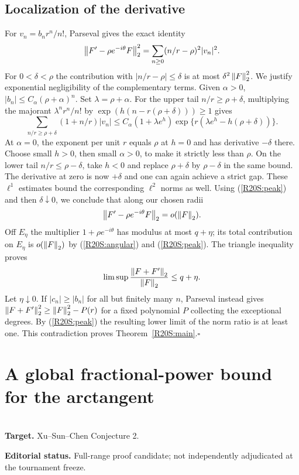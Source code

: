 \documentclass[11pt,a4paper]{article}
\begin{document}
\subsection{Localization of the derivative}
For $v_n=b_n r^n/n!$, Parseval gives the exact identity
\[
 \left\|F'-\rho e^{-i\theta}F\right\|_2^{2}
       =\sum_{n\ge0}(n/r-\rho)^2|v_n|^2.
\]
For $0<\delta<\rho$ the contribution with $|n/r-\rho|\le\delta$ is at most $\delta^2\left\|F\right\|_2^2$. We justify exponential negligibility of the complementary terms. Given $\alpha>0$, $|b_n|\le C_\alpha(\rho+\alpha)^n$. Set $\lambda=\rho+\alpha$. For the upper tail $n/r\ge\rho+\delta$, multiplying the majorant $\lambda^n r^n/n!$ by $\exp(h(n-r(\rho+\delta)))\ge1$ gives
\[
 \sum_{n/r\ge\rho+\delta}(1+n/r)|v_n|
 \le C_\alpha(1+\lambda e^h)
 \exp\{r(\lambda e^h-h(\rho+\delta))\}.
\]
At $\alpha=0$, the exponent per unit $r$ equals $\rho$ at $h=0$ and has derivative $-\delta$ there. Choose small $h>0$, then small $\alpha>0$, to make it strictly less than $\rho$. On the lower tail $n/r\le\rho-\delta$, take $h<0$ and replace $\rho+\delta$ by $\rho-\delta$ in the same bound. The derivative at zero is now $+\delta$ and one can again achieve a strict gap. These $\ell^1$ estimates bound the corresponding $\ell^2$ norms as well. Using (\ref{R20S:peak}) and then $\delta\downarrow0$, we conclude that along our chosen radii
\[
 \left\|F'-\rho e^{-i\theta}F\right\|_2=o(\left\|F\right\|_2).
\]
Off $E_\eta$ the multiplier $1+\rho e^{-i\theta}$ has modulus at most $q+\eta$; its total contribution on $E_\eta$ is $o(\left\|F\right\|_2)$ by (\ref{R20S:angular}) and (\ref{R20S:peak}). The triangle inequality proves
\[
 \limsup\frac{\left\|F+F'\right\|_2}{\left\|F\right\|_2}\le q+\eta .
\]
Let $\eta\downarrow0$. If $|c_n|\ge|b_n|$ for all but finitely many $n$, Parseval instead gives $\left\|F+F'\right\|_2^2\ge\left\|F\right\|_2^2-P(r)$ for a fixed polynomial $P$ collecting the exceptional degrees. By (\ref{R20S:peak}) the resulting lower limit of the norm ratio is at least one. This contradiction proves Theorem~\ref{R20S:main}.\hfill$\square$
\endgroup


\clearpage

\section{A global fractional-power bound for the arctangent}
\label{section:R21M}
\\[3pt]
\noindent\textbf{Target.} Xu--Sun--Chen Conjecture 2.

\noindent\textbf{Editorial status.} Full-range proof candidate; not independently adjudicated at the tournament freeze. 
\end{document}
